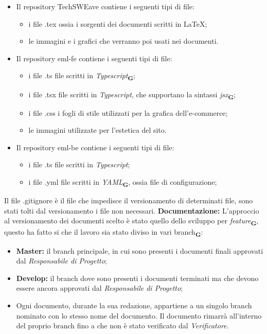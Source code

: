 \begin{itemize}
    \item Il repository TechSWEave contiene i seguenti tipi di file:
          \begin{itemize}
              \item i file {\selectfont .tex} ossia i sorgenti dei documenti scritti in \LaTeX;
              \item le immagini e i grafici che verranno poi usati nei documenti.
          \end{itemize}
    \item Il repository eml-fe contiene i seguenti tipi di file:
          \begin{itemize}
              \item i file {\selectfont .ts} file scritti in \textit{Typescript}\textsubscript{\textbf{G}};
              \item i file {\selectfont .tsx} file scritti in \textit{Typescript}, che supportano la sintassi \textit{jsx}\textsubscript{\textbf{G}};
              \item i file {\selectfont .css} i fogli di stile utilizzati per la grafica dell'e-commerce;
              \item le immagini utilizzate per l'estetica del sito.
          \end{itemize}
    \item Il repository eml-be contiene i seguenti tipi di file:
          \begin{itemize}
              \item i file {\selectfont .ts} file scritti in \textit{Typescript};
              \item i file {\selectfont .yml} file scritti in \textit{YAML}\textsubscript{\textbf{G}}, ossia file di configurazione;
          \end{itemize}
\end{itemize}
Il file {\selectfont .gitignore} è il file che impedisce il versionamento di determinati file, sono stati tolti dal versionamento i file non necessari.
\textbf{Documentazione:}
L'approccio al versionamento dei documenti scelto è stato quello dello sviluppo per \textit{feature}\textsubscript{\textbf{G}}, questo ha fatto si che il lavoro sia stato diviso in vari branch\textsubscript{\textbf{G}}:
\begin{itemize}
    \renewcommand\labelitemi{-}
    \item \textbf{Master:} il branch principale, in cui sono presenti i documenti finali approvati dal \textit{Responsabile di Progetto};
    \item \textbf{Develop:} il branch dove sono presenti i documenti terminati ma che devono essere ancora approvati dal \textit{Responsabile di Progetto};
    \item Ogni documento, durante la sua redazione, appartiene a un singolo branch nominato con lo stesso nome del documento. Il documento rimarrà all'interno del proprio branch fino a che non è stato verificato dal \textit{Verificatore}.
\end{itemize}
